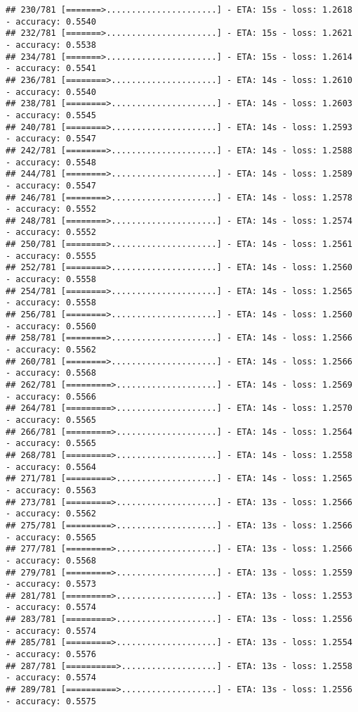 \documentclass[
]{article}
\begin{document}
\begin{verbatim}
## 230/781 [=======>......................] - ETA: 15s - loss: 1.2618 - accuracy: 0.5540
## 232/781 [=======>......................] - ETA: 15s - loss: 1.2621 - accuracy: 0.5538
## 234/781 [=======>......................] - ETA: 15s - loss: 1.2614 - accuracy: 0.5541
## 236/781 [========>.....................] - ETA: 14s - loss: 1.2610 - accuracy: 0.5540
## 238/781 [========>.....................] - ETA: 14s - loss: 1.2603 - accuracy: 0.5545
## 240/781 [========>.....................] - ETA: 14s - loss: 1.2593 - accuracy: 0.5547
## 242/781 [========>.....................] - ETA: 14s - loss: 1.2588 - accuracy: 0.5548
## 244/781 [========>.....................] - ETA: 14s - loss: 1.2589 - accuracy: 0.5547
## 246/781 [========>.....................] - ETA: 14s - loss: 1.2578 - accuracy: 0.5552
## 248/781 [========>.....................] - ETA: 14s - loss: 1.2574 - accuracy: 0.5552
## 250/781 [========>.....................] - ETA: 14s - loss: 1.2561 - accuracy: 0.5555
## 252/781 [========>.....................] - ETA: 14s - loss: 1.2560 - accuracy: 0.5558
## 254/781 [========>.....................] - ETA: 14s - loss: 1.2565 - accuracy: 0.5558
## 256/781 [========>.....................] - ETA: 14s - loss: 1.2560 - accuracy: 0.5560
## 258/781 [========>.....................] - ETA: 14s - loss: 1.2566 - accuracy: 0.5562
## 260/781 [========>.....................] - ETA: 14s - loss: 1.2566 - accuracy: 0.5568
## 262/781 [=========>....................] - ETA: 14s - loss: 1.2569 - accuracy: 0.5566
## 264/781 [=========>....................] - ETA: 14s - loss: 1.2570 - accuracy: 0.5565
## 266/781 [=========>....................] - ETA: 14s - loss: 1.2564 - accuracy: 0.5565
## 268/781 [=========>....................] - ETA: 14s - loss: 1.2558 - accuracy: 0.5564
## 271/781 [=========>....................] - ETA: 14s - loss: 1.2565 - accuracy: 0.5563
## 273/781 [=========>....................] - ETA: 13s - loss: 1.2566 - accuracy: 0.5562
## 275/781 [=========>....................] - ETA: 13s - loss: 1.2566 - accuracy: 0.5565
## 277/781 [=========>....................] - ETA: 13s - loss: 1.2566 - accuracy: 0.5568
## 279/781 [=========>....................] - ETA: 13s - loss: 1.2559 - accuracy: 0.5573
## 281/781 [=========>....................] - ETA: 13s - loss: 1.2553 - accuracy: 0.5574
## 283/781 [=========>....................] - ETA: 13s - loss: 1.2556 - accuracy: 0.5574
## 285/781 [=========>....................] - ETA: 13s - loss: 1.2554 - accuracy: 0.5576
## 287/781 [==========>...................] - ETA: 13s - loss: 1.2558 - accuracy: 0.5574
## 289/781 [==========>...................] - ETA: 13s - loss: 1.2556 - accuracy: 0.5575

\end{verbatim}
\end{document}
